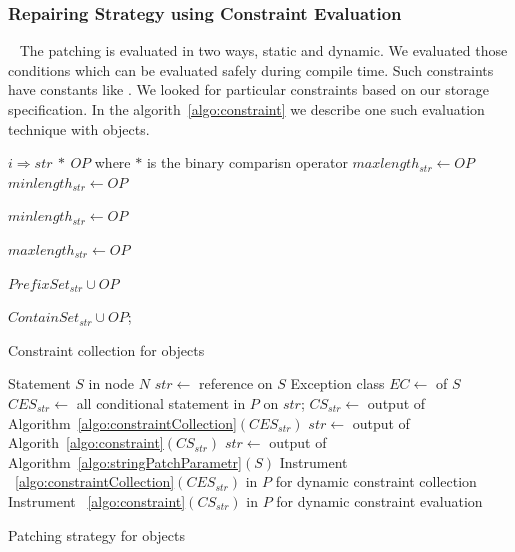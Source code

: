 \subsubsection{Repairing Strategy using Constraint Evaluation}
\label{subsubsec:repairingStrategyConstraint}

~\newline
The patching is evaluated in two ways, static and dynamic. We evaluated those
conditions which can be evaluated safely during compile time. Such constraints
have constants like . We looked for particular
constraints based on our storage specification. In the algorith~\ref{algo:constraint}
we describe one such evaluation technique with  objects.

\begin{algorithm}
\scriptsize
\DontPrintSemicolon
{}
\Begin
{ 
  {
   $i \Rightarrow str\ *\ OP$\;
   where $*$ is the binary comparisn operator\;
   {
    $maxlength_{str} \longleftarrow OP$\;
    $minlength_{str} \longleftarrow OP$\;
   }
   
   {
    $minlength_{str} \longleftarrow OP$\;
   }
   
   {
    $maxlength_{str} \longleftarrow OP$\;
   }
   
   {
    $PrefixSet_{str} \cup OP$\;
   }
   
   {
    $ContainSet_{str} \cup OP$;
   }
  }
}
\caption{Constraint collection for  objects}
 \label{algo:constraintCollection}
\end{algorithm}

\begin{algorithm}
\scriptsize
\DontPrintSemicolon
{}
\Begin
{ 
 {
  Statement $S$ in node $N$\;
  {
  	$str \longleftarrow$  reference on $S$\; 
  	{
  		Exception class $EC \longleftarrow$  of $S$\;
  		$CES_{str} \longleftarrow$ all conditional statement in $P$ on $str$;
  		$CS_{str} \longleftarrow$ output of
  		Algorithm~\ref{algo:constraintCollection}$(CES_{str})$ \;
  		{ 
  			$str \longleftarrow$ output of Algorith~\ref{algo:constraint}$(CS_{str})$\;
  		}
  		\Else
  		{
  			$str \longleftarrow$ output of
  			Algorithm~\ref{algo:stringPatchParametr}$(S)$\; 
  		}
  		Instrument ~\ref{algo:constraintCollection}$(CES_{str})$ in $P$ for dynamic
  		constraint collection\;
  		Instrument ~\ref{algo:constraint}$(CS_{str})$ in $P$ for dynamic
  		constraint evaluation\;
  	}
  } 
 }
}
\caption{Patching strategy for  objects}
 \label{algo:patchingStrategy}
\end{algorithm}